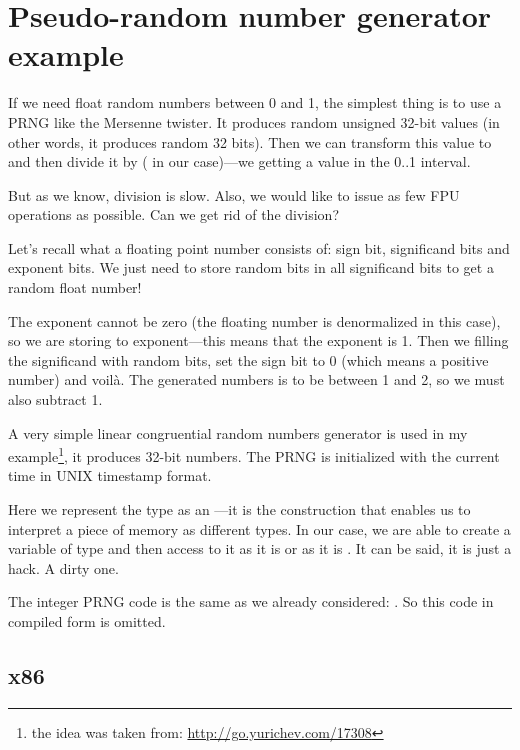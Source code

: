 \section{Pseudo-random number generator example}
\label{FPU_PRNG}

If we need float random numbers between 0 and 1, the simplest thing is to use a \ac{PRNG} like
the Mersenne twister. 
It produces random unsigned 32-bit values (in other words, it produces random 32 bits).
Then we can transform this value to \Tfloat and then
divide it by  ( in our case)---we getting a value in the 0..1 interval.

But as we know, division is slow.
Also, we would like to issue as few FPU operations as possible.
Can we get rid of the division?


Let's recall what a floating point number consists of: sign bit, significand bits and exponent bits.
We just need to store random bits in all significand bits to get a random float number!

The exponent cannot be zero (the floating number is denormalized in this case), so we are storing  
to exponent---this means that the exponent is 1. 
Then we filling the significand with random bits, set the sign bit to
0 (which means a positive number) and voilà.
The generated numbers is to be between 1 and 2, so we must also subtract 1.

\newcommand{\URLXOR}{\url{http://go.yurichev.com/17308}}

A very simple linear congruential random numbers generator is used in my 
example\footnote{the idea was taken from: \URLXOR}, it produces 32-bit numbers. 
The \ac{PRNG} is initialized with the current time in UNIX timestamp format.

Here we represent the \Tfloat type as an ---it is the \CCpp construction that enables us
to interpret a piece of memory as different types.
In our case, we are able to create a variable
of type  and then access to it as it is \Tfloat or as it is . 
It can be said, it is just a hack. A dirty one.


The integer \ac{PRNG} code is the same as we already considered: .
So this code in compiled form is omitted.



\subsection{x86}

